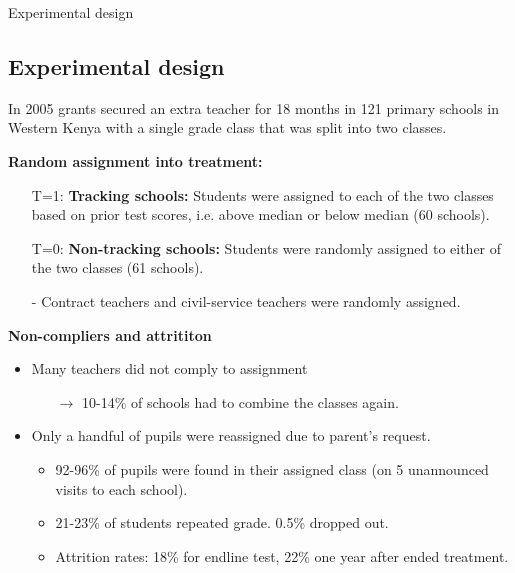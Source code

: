 \documentclass[9pt]{beamer}
\newcommand{\comment}[1]{}  %
\numberwithin{equation}{section}
\begin{document}
\begin{frame}{Experimental design}
  \subsection{Experimental design}
  In 2005 grants secured an extra teacher for 18 months in 121 primary schools in Western Kenya with a single  grade class that was split into two classes.
  \comment{140 schools, but 19 are excluded from analysis due to having more than 1 first-grade class $\rightarrow$ Sampling bias: Only smaller schools (one \nth{1} grade).}

  \textbf{Random assignment into treatment:}
    \begin{itemize}
      \item[T=1:] \textbf{Tracking schools:} Students were assigned to each of the two classes based on prior test scores, i.e. above median or below median (60 schools).
      \item[T=0:] \textbf{Non-tracking schools:} Students were randomly assigned to either of the two classes (61 schools).
      \item[-] Contract teachers and civil-service teachers were randomly assigned.
    \end{itemize}
  \textbf{Non-compliers and attrititon}
    \begin{itemize}
      \item Many teachers did not comply to assignment
      \begin{itemize}
        \item[$\rightarrow$] 10-14\% of schools had to combine the classes again.
      \end{itemize}
      \item Only a handful of pupils were reassigned due to parent's request.
      \begin{itemize}
        \item 92-96\% of pupils were found in their assigned class (on 5 unannounced visits to each school).
        \comment{Regardless, the analysis is based on the initial assignment.}
        \item 21-23\% of students repeated  grade. 0.5\% dropped out.
        \item Attrition rates: 18\% for endline test, 22\% one year after ended treatment.
      \end{itemize}
    \end{itemize}
\end{frame}
\end{document}
